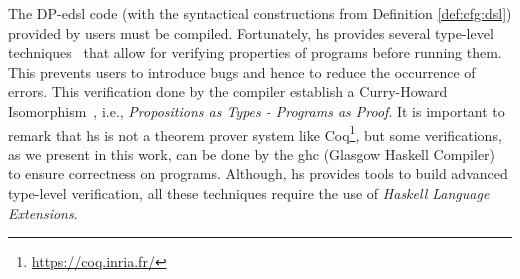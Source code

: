 The DP-\acrshort{edsl} code (with the syntactical constructions from Definition \ref{def:cfg:dsl}) provided by users must be compiled. Fortunately, \acrshort{hs} provides several type-level techniques~\cite{type-haskell} that allow for verifying properties of programs before running them. This prevents users to introduce bugs and hence to reduce the occurrence of  errors. This verification done by the compiler establish a Curry-Howard Isomorphism~\cite{curryhoward}, i.e., \emph{Propositions as Types - Programs as Proof}. It is important to remark that \acrshort{hs} is not a theorem prover system like Coq\footnote{\url{https://coq.inria.fr/}}, but some verifications, as we present in this work, can be done by the \acrshort{ghc} (Glasgow Haskell Compiler) to ensure correctness on programs.
Although, \acrshort{hs} provides tools to build advanced type-level verification, all these techniques require the use  of \emph{Haskell Language Extensions}.


